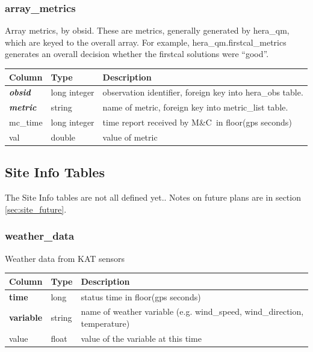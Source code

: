 \documentclass{article}
\newcommand{\mc}{M\&C}
\begin{document}
{\subsubsection{array\_metrics}
Array metrics, by obsid. These are metrics, generally generated by
hera\_qm, which are keyed to the overall array. For example, hera\_qm.firstcal\_metrics
generates an overall decision whether the firstcal solutions were ``good''.

\begin{center}
 \begin{tabular}{| p{4cm} | p{2cm} | p{10cm} |}
\hline
 {\bf Column} & {\bf Type}  & {\bf Description} \\ [0.5ex]  \hline\hline
\textbf{\textit{obsid}} & long integer & observation identifier, foreign key into hera\_obs table. \\ \hline
\textbf{\textit{metric}} & string & name of metric, foreign key into metric\_list table. \\ \hline
mc\_time & long integer & time report received by \mc\ in floor(gps seconds) \\ \hline
val & double & value of metric \\ \hline
\end{tabular}
\end{center}



\subsection{Site Info Tables}
The Site Info tables are not all defined yet.. Notes on future plans are in section \ref{sec:site_future}.

\subsubsection{weather\_data}
Weather data from KAT sensors
\begin{center}
 \begin{tabular}{| p{4cm} | p{2cm} | p{10cm} |}
\hline
 {\bf Column} & {\bf Type}  & {\bf Description} \\ [0.5ex]  \hline\hline
\textbf{time} & long & status time in floor(gps seconds)\\ \hline
\textbf{variable} & string & name of weather variable (e.g. wind\_speed,  wind\_direction, temperature) \\ \hline
value & float & value of the variable at this time \\\hline
\end{tabular}
\end{center}


}
\end{document}
